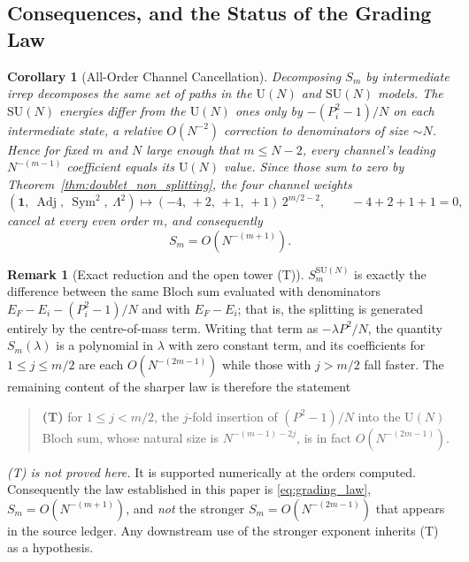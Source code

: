 \documentclass[11pt,a4paper]{article}
\newtheorem{corollary}[theorem]{Corollary}
\theoremstyle{definition}
\newtheorem{remark}[theorem]{Remark}
\DeclareMathOperator{\Adj}{Adj}
\DeclareMathOperator{\Sym}{Sym}
\newcommand{\SU}{\mathrm{SU}}
\newcommand{\U}{\mathrm{U}}
\begin{document}
\subsection{Consequences, and the Status of the Grading Law}\label{sec:fermion_status}

\begin{corollary}[All-Order Channel Cancellation]\label{cor:channel_cancel}
Decomposing $S_m$ by intermediate irrep decomposes the same set of paths in the $\U(N)$ and $\SU(N)$ models. The $\SU(N)$ energies differ from the $\U(N)$ ones only by $-(P_i^2-1)/N$ on each intermediate state, a relative $O(N^{-2})$ correction to denominators of size $\sim N$. Hence for fixed $m$ and $N$ large enough that $m\le N-2$, every channel's leading $N^{-(m-1)}$ coefficient equals its $\U(N)$ value. Since those sum to zero by Theorem~\ref{thm:doublet_non_splitting}, the four channel weights
\begin{equation}\label{eq:channel_cancel}
  (\mathbf{1},\ \Adj,\ \Sym^2,\ \Lambda^2) \longmapsto (-4,\, +2,\, +1,\, +1)\,2^{m/2-2},
  \qquad -4+2+1+1 = 0,
\end{equation}
cancel at every even order $m$, and consequently
\begin{equation}\label{eq:grading_law}
  S_m = O\!\left(N^{-(m+1)}\right).
\end{equation}
\end{corollary}

\begin{remark}[Exact reduction and the open tower (T)]\label{rem:tower}
$S_m^{\SU(N)}$ is exactly the difference between the same Bloch sum evaluated with denominators $E_F - E_i - (P_i^2-1)/N$ and with $E_F - E_i$; that is, the splitting is generated entirely by the centre-of-mass term. Writing that term as $-\lambda P^2/N$, the quantity $S_m(\lambda)$ is a polynomial in $\lambda$ with zero constant term, and its coefficients for $1\le j\le m/2$ are each $O(N^{-(2m-1)})$ while those with $j>m/2$ fall faster. The remaining content of the sharper law is therefore the statement
\begin{quote}
  \textbf{(T)} \quad for $1\le j<m/2$, the $j$-fold insertion of $(P^2-1)/N$ into the $\U(N)$ Bloch sum, whose natural size is $N^{-(m-1)-2j}$, is in fact $O(N^{-(2m-1)})$.
\end{quote}
\emph{(T) is not proved here.} It is supported numerically at the orders computed. Consequently the law established in this paper is \eqref{eq:grading_law}, $S_m = O(N^{-(m+1)})$, and \emph{not} the stronger $S_m = O(N^{-(2m-1)})$ that appears in the source ledger. Any downstream use of the stronger exponent inherits (T) as a hypothesis.
\end{remark}
\end{document}

